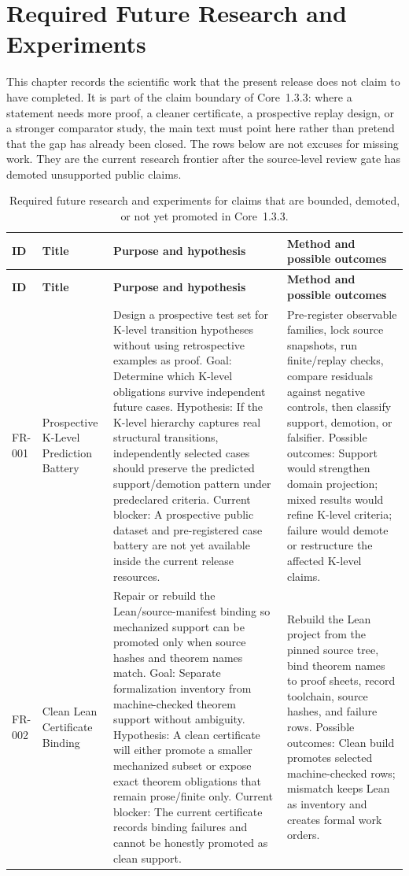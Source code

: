 \section{Required Future Research and Experiments}
\label{sec:required-future-research-r015}

This chapter records the scientific work that the present release does not claim to have completed. It is part of the claim boundary of Core~1.3.3: where a statement needs more proof, a cleaner certificate, a prospective replay design, or a stronger comparator study, the main text must point here rather than pretend that the gap has already been closed. The rows below are not excuses for missing work. They are the current research frontier after the source-level review gate has demoted unsupported public claims.

\begin{longtable}{@{}L{0.08\textwidth}L{0.19\textwidth}L{0.28\textwidth}L{0.31\textwidth}@{}}
\caption{Required future research and experiments for claims that are bounded, demoted, or not yet promoted in Core~1.3.3.}\\
\toprule
\textbf{ID} & \textbf{Title} & \textbf{Purpose and hypothesis} & \textbf{Method and possible outcomes} \\
\midrule
\endfirsthead
\toprule
\textbf{ID} & \textbf{Title} & \textbf{Purpose and hypothesis} & \textbf{Method and possible outcomes} \\
\midrule
\endhead
FR-001 & Prospective K-Level Prediction Battery & Design a prospective test set for K-level transition hypotheses without using retrospective examples as proof. Goal: Determine which K-level obligations survive independent future cases. Hypothesis: If the K-level hierarchy captures real structural transitions, independently selected cases should preserve the predicted support/demotion pattern under predeclared criteria. Current blocker: A prospective public dataset and pre-registered case battery are not yet available inside the current release resources. & Pre-register observable families, lock source snapshots, run finite/replay checks, compare residuals against negative controls, then classify support, demotion, or falsifier. Possible outcomes: Support would strengthen domain projection; mixed results would refine K-level criteria; failure would demote or restructure the affected K-level claims. \\
FR-002 & Clean Lean Certificate Binding & Repair or rebuild the Lean/source-manifest binding so mechanized support can be promoted only when source hashes and theorem names match. Goal: Separate formalization inventory from machine-checked theorem support without ambiguity. Hypothesis: A clean certificate will either promote a smaller mechanized subset or expose exact theorem obligations that remain prose/finite only. Current blocker: The current certificate records binding failures and cannot be honestly promoted as clean support. & Rebuild the Lean project from the pinned source tree, bind theorem names to proof sheets, record toolchain, source hashes, and failure rows. Possible outcomes: Clean build promotes selected machine-checked rows; mismatch keeps Lean as inventory and creates formal work orders. \\

\end{longtable}
